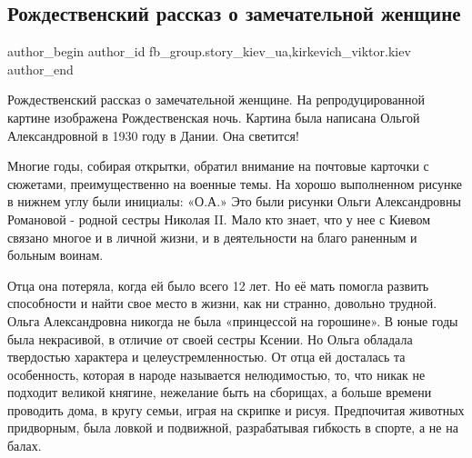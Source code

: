  
 
 
 
 
 
\subsection{Рождественский рассказ о замечательной женщине}
\label{sec:07_01_2022.fb.fb_group.story_kiev_ua.2.olga_aleksandrovna}
 
\ifcmt
 author_begin
   author_id fb_group.story_kiev_ua,kirkevich_viktor.kiev
 author_end
\fi

Рождественский рассказ о замечательной женщине. На репродуцированной картине
изображена Рождественская ночь. Картина была написана Ольгой Александровной в
1930 году в Дании. Она светится!

Многие годы, собирая открытки, обратил внимание на почтовые карточки с
сюжетами, преимущественно на военные темы. На хорошо выполненном рисунке в
нижнем углу были инициалы: «О.А.» Это были рисунки Ольги Александровны
Романовой - родной сестры Николая II. Мало кто знает, что у нее с Киевом
связано многое и в личной жизни, и в деятельности на благо раненным и больным
воинам.


Отца она потеряла, когда ей было всего 12 лет. Но её мать помогла развить
способности и найти свое место в жизни, как ни странно, довольно трудной. Ольга
Александровна никогда не была «принцессой на горошине». В юные годы была
некрасивой, в отличие от своей сестры Ксении. Но Ольга обладала твердостью
характера и целеустремленностью. От отца ей досталась та особенность, которая в
народе называется нелюдимостью, то, что никак не подходит великой княгине,
нежелание быть на сборищах, а больше времени проводить дома, в кругу семьи,
играя на скрипке и рисуя. Предпочитая животных придворным, была ловкой и
подвижной, разрабатывая гибкость в спорте, а не на балах. 

